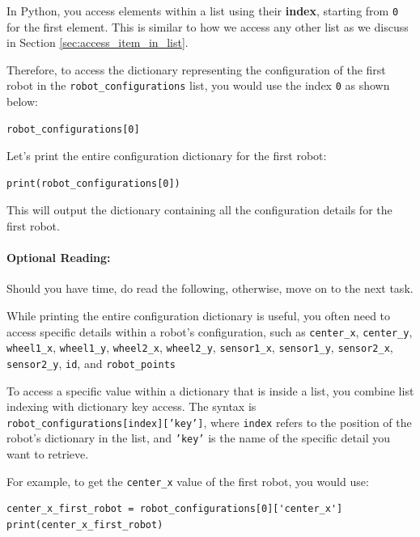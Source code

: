 In Python, you access elements within a list using their \textbf{index}, starting from \texttt{0} for the first element. This is similar to how we access any other list as we discuss in Section \ref{sec:access_item_in_list}.

Therefore, to access the dictionary representing the configuration of the first robot in the \texttt{robot\_configurations} list, you would use the index \texttt{0} as shown below:

\begin{verbatim}
robot_configurations[0]
\end{verbatim}


Let's print the entire configuration dictionary for the first robot:

\begin{verbatim}
print(robot_configurations[0])
\end{verbatim}

This will output the dictionary containing all the configuration details for the first robot.



\paragraph{Optional Reading:}

Should you have time, do read the following, otherwise, move on to the next task.

While printing the entire configuration dictionary is useful, you often need to access specific details within a robot's configuration, such as \texttt{center\_x}, \texttt{center\_y}, \texttt{wheel1\_x}, \texttt{wheel1\_y}, \texttt{wheel2\_x}, \texttt{wheel2\_y}, \texttt{sensor1\_x}, \texttt{sensor1\_y}, \texttt{sensor2\_x}, \texttt{sensor2\_y}, \texttt{id}, and \texttt{robot\_points}

To access a specific value within a dictionary that is inside a list, you combine list indexing with dictionary key access. The syntax is \texttt{robot\_configurations[index]['key']}, where \texttt{index} refers to the position of the robot's dictionary in the list, and \texttt{'key'} is the name of the specific detail you want to retrieve.

For example, to get the \texttt{center\_x} value of the first robot, you would use:

\begin{verbatim}
center_x_first_robot = robot_configurations[0]['center_x']
print(center_x_first_robot)
\end{verbatim}

